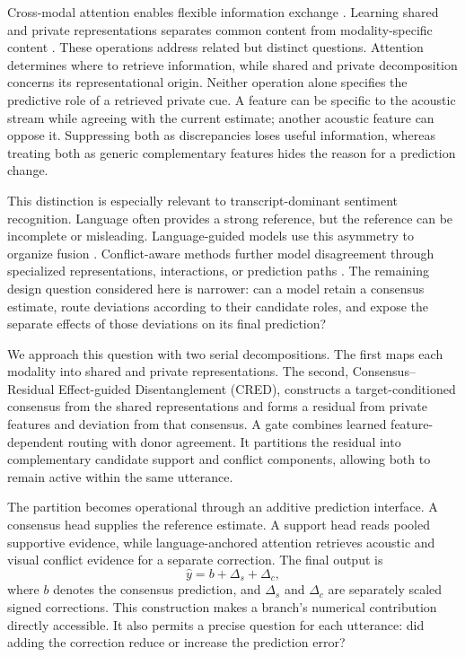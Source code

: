 \documentclass[review,12pt]{elsarticle}
\begin{document}
Cross-modal attention enables flexible information exchange \cite{mult}. Learning shared and private representations separates common content from modality-specific content \cite{misa}. These operations address related but distinct questions. Attention determines where to retrieve information, while shared and private decomposition concerns its representational origin. Neither operation alone specifies the predictive role of a retrieved private cue. A feature can be specific to the acoustic stream while agreeing with the current estimate; another acoustic feature can oppose it. Suppressing both as discrepancies loses useful information, whereas treating both as generic complementary features hides the reason for a prediction change.

This distinction is especially relevant to transcript-dominant sentiment recognition. Language often provides a strong reference, but the reference can be incomplete or misleading. Language-guided models use this asymmetry to organize fusion \cite{tetfn,almt}. Conflict-aware methods further model disagreement through specialized representations, interactions, or prediction paths \cite{mcan,eca}. The remaining design question considered here is narrower: can a model retain a consensus estimate, route deviations according to their candidate roles, and expose the separate effects of those deviations on its final prediction?

We approach this question with two serial decompositions. The first maps each modality into shared and private representations. The second, Consensus--Residual Effect-guided Disentanglement (CRED), constructs a target-conditioned consensus from the shared representations and forms a residual from private features and deviation from that consensus. A gate combines learned feature-dependent routing with donor agreement. It partitions the residual into complementary candidate support and conflict components, allowing both to remain active within the same utterance.

The partition becomes operational through an additive prediction interface. A consensus head supplies the reference estimate. A support head reads pooled supportive evidence, while language-anchored attention retrieves acoustic and visual conflict evidence for a separate correction. The final output is
\begin{equation}
\hat y=b+\Delta_s+\Delta_c,
\label{eq:additive}
\end{equation}
where $b$ denotes the consensus prediction, and $\Delta_s$ and $\Delta_c$ are separately scaled signed corrections. This construction makes a branch's numerical contribution directly accessible. It also permits a precise question for each utterance: did adding the correction reduce or increase the prediction error?
\end{document}
